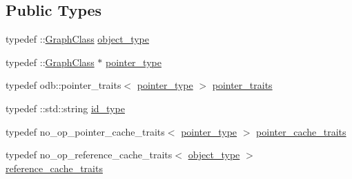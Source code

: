 \subsection*{Public Types}
\begin{DoxyCompactItemize}
\item 
typedef \+::\hyperlink{class_graph_class}{Graph\+Class} \hyperlink{classodb_1_1access_1_1object__traits_3_01_1_1_graph_class_01_4_a0808c9b0dc597786e3b5e11fc0f63e43}{object\+\_\+type}
\item 
typedef \+::\hyperlink{class_graph_class}{Graph\+Class} $\ast$ \hyperlink{classodb_1_1access_1_1object__traits_3_01_1_1_graph_class_01_4_adc238f26f5932c57db8604b0cfa1d038}{pointer\+\_\+type}
\item 
typedef odb\+::pointer\+\_\+traits$<$ \hyperlink{classodb_1_1access_1_1object__traits_3_01_1_1_graph_class_01_4_adc238f26f5932c57db8604b0cfa1d038}{pointer\+\_\+type} $>$ \hyperlink{classodb_1_1access_1_1object__traits_3_01_1_1_graph_class_01_4_a19143190ae9943ffad744f419c96716b}{pointer\+\_\+traits}
\item 
typedef \+::std\+::string \hyperlink{classodb_1_1access_1_1object__traits_3_01_1_1_graph_class_01_4_adf9a24fcdfb5c36b924d7f5a4b0d76df}{id\+\_\+type}
\item 
typedef no\+\_\+op\+\_\+pointer\+\_\+cache\+\_\+traits$<$ \hyperlink{classodb_1_1access_1_1object__traits_3_01_1_1_graph_class_01_4_adc238f26f5932c57db8604b0cfa1d038}{pointer\+\_\+type} $>$ \hyperlink{classodb_1_1access_1_1object__traits_3_01_1_1_graph_class_01_4_a669dd84b45d2d33c819b558053f00641}{pointer\+\_\+cache\+\_\+traits}
\item 
typedef no\+\_\+op\+\_\+reference\+\_\+cache\+\_\+traits$<$ \hyperlink{classodb_1_1access_1_1object__traits_3_01_1_1_graph_class_01_4_a0808c9b0dc597786e3b5e11fc0f63e43}{object\+\_\+type} $>$ \hyperlink{classodb_1_1access_1_1object__traits_3_01_1_1_graph_class_01_4_a5b69775ee738f198b54451049e4e279d}{reference\+\_\+cache\+\_\+traits}
\end{DoxyCompactItemize}
